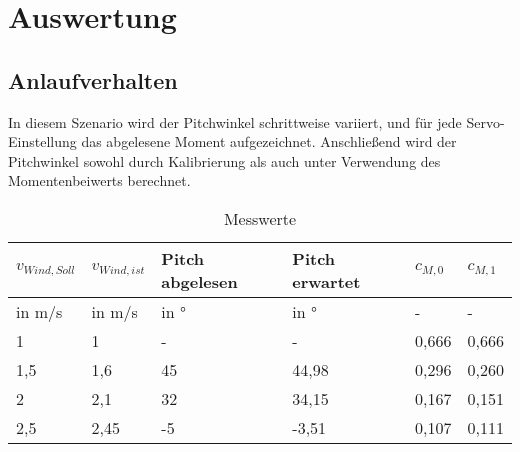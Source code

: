 \section{Auswertung}
\label{sec:Auswertung}
\subsection{Anlaufverhalten}
In diesem Szenario wird der Pitchwinkel schrittweise variiert, und für jede Servo-Einstellung das abgelesene Moment aufgezeichnet. Anschließend wird der Pitchwinkel sowohl durch Kalibrierung als auch unter Verwendung des Momentenbeiwerts berechnet.
\begin{table}[H]
    \centering
    \caption{Messwerte}
    \label{tab_Messwerte_Anlauf_230615}
    \small
    \begin{tabular}{|l|l|l|l|l|l|}
        \hline
        \rowcolor[HTML]{70AD47} 
        {\color[HTML]{FFFFFF} \textbf{$v_{Wind,Soll}$}} & {\color[HTML]{FFFFFF} \textbf{$v_{Wind,ist}$}} & {\color[HTML]{FFFFFF} \textbf{Pitch abgelesen}} & {\color[HTML]{FFFFFF} \textbf{Pitch erwartet}} & {\color[HTML]{FFFFFF} \textbf{$c_{M,0}$}} & {\color[HTML]{FFFFFF} \textbf{$c_{M,1}$}} \\ \hline
        \rowcolor[HTML]{70AD47} 
        in m/s                                         & in m/s                                      & in °                                            & in °                                           & -                                      & -                                      \\ \hline
        \rowcolor[HTML]{E2EFDA} 
        1                                              & 1                                           & -                                               & -                                              & 0,666                                  & 0,666                                  \\ \hline
        \rowcolor[HTML]{C6E0B4} 
        1,5                                            & 1,6                                         & 45                                              & 44,98                                              & 0,296                                  & 0,260                                  \\ \hline
        \rowcolor[HTML]{E2EFDA} 
        2                                              & 2,1                                         & 32                                              & 34,15                                              & 0,167                                  & 0,151                                  \\ \hline
        \rowcolor[HTML]{C6E0B4} 
        2,5                                            & 2,45                                        & -5                                              & -3,51                                       & 0,107                                  & 0,111                                  \\ \hline
    \end{tabular}
\end{table}


